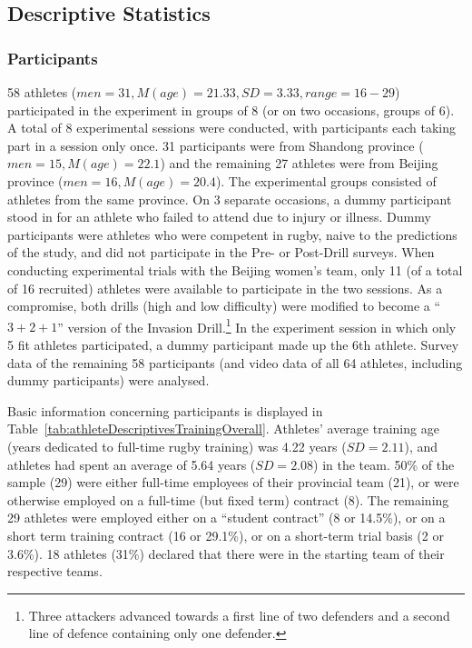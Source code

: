 \begin{CJK}{UTF8}{gbsn}
\subsection{Descriptive Statistics \label{sec:descriptives}}

\subsubsection{Participants}
58 athletes ($men = 31, M(age) = 21.33, SD = 3.33, range = 16-29$) participated in the experiment in groups of 8 (or on two occasions, groups of 6).  A total of 8 experimental sessions were conducted, with participants each taking part in a session only once.  31 participants were from Shandong province ($men = 15, M(age) = 22.1$) and the remaining 27 athletes were from Beijing province ($men = 16, M(age) = 20.4$).  The experimental groups consisted of athletes from the same province. On 3 separate occasions, a dummy participant stood in for an athlete who failed to attend due to injury or illness.  Dummy participants were athletes who were competent in rugby, naive to the predictions of the study, and did not participate in the Pre- or Post-Drill surveys. When conducting experimental trials with the Beijing women's team, only 11 (of a total of 16 recruited) athletes were available to participate in the two sessions.  As a compromise, both drills (high and low difficulty) were modified to become a ``$3+2+1$'' version of the Invasion Drill.\footnote{Three attackers advanced towards a first line of two defenders and a second line of defence containing only one defender.} In the experiment session in which only 5 fit athletes participated, a dummy participant made up the 6th athlete.  Survey data of the remaining 58 participants (and video data of all 64 athletes, including dummy participants) were analysed.



Basic information concerning participants is displayed in Table~\ref{tab:athleteDescriptivesTrainingOverall}.  Athletes' average training age (years dedicated to full-time rugby training) was 4.22 years ($SD = 2.11$), and athletes had spent an average of 5.64 years ($SD = 2.08$) in the team.  50\% of the sample (29) were either full-time employees of their provincial team (21), or were otherwise employed on a full-time (but fixed term) contract (8).  The remaining 29 athletes were employed either on a ``student contract'' (8 or 14.5\%), or on a short term training contract (16 or 29.1\%), or on a short-term trial basis (2 or 3.6\%).  18 athletes (31\%) declared that there were in the starting team of their respective teams.


\end{CJK}
